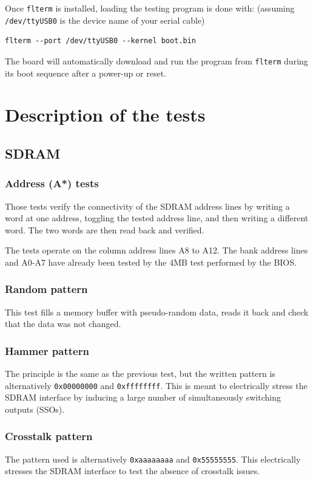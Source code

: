 \documentclass[a4paper,11pt]{article}
\begin{document}
Once \verb!flterm! is installed, loading the testing program is done with: (assuming \verb!/dev/ttyUSB0! is the device name of your serial cable)
\begin{verbatim}
flterm --port /dev/ttyUSB0 --kernel boot.bin
\end{verbatim}

The board will automatically download and run the program from \verb!flterm! during its boot sequence after a power-up or reset.

\section{Description of the tests}
\subsection{SDRAM}
\subsubsection{Address (A*) tests}
Those tests verify the connectivity of the SDRAM address lines by writing a word at one address, toggling the tested address line, and then writing a different word. The two words are then read back and verified.

The tests operate on the column address lines A8 to A12. The bank address lines and A0-A7 have already been tested by the 4MB test performed by the BIOS.

\subsubsection{Random pattern}
This test fills a memory buffer with pseudo-random data, reads it back and check that the data was not changed.

\subsubsection{Hammer pattern}
The principle is the same as the previous test, but the written pattern is alternatively \verb!0x00000000! and \verb!0xffffffff!. This is meant to electrically stress the SDRAM interface by inducing a large number of simultaneously switching outputs (SSOs).

\subsubsection{Crosstalk pattern}
The pattern used is alternatively \verb!0xaaaaaaaa! and \verb!0x55555555!. This electrically stresses the SDRAM interface to test the absence of crosstalk issues.
\end{document}
